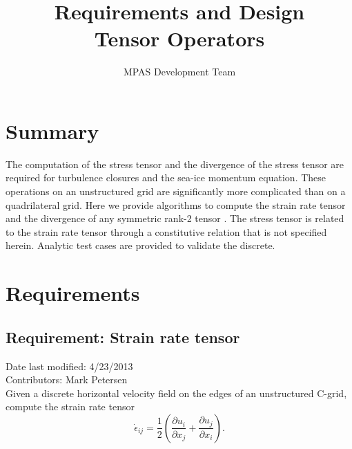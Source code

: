 \documentclass[11pt]{report}
\begin{document}
\title{
Requirements and Design\\
Tensor Operators}
\author{MPAS Development Team}

\maketitle
\tableofcontents


\chapter{Summary}

The computation of the stress tensor and the divergence of the stress tensor are required for turbulence closures and the sea-ice momentum equation.  These operations on an unstructured grid are significantly more complicated than on a quadrilateral grid.  Here we provide algorithms to compute the strain rate tensor and the divergence of any symmetric rank-2 tensor . The stress tensor is related to the strain rate tensor through a constitutive relation that is not specified herein.  Analytic test cases are provided to validate the discrete.




\chapter{Requirements}

\section{Requirement: Strain rate tensor}
Date last modified: 4/23/2013 \\
Contributors: Mark Petersen \\

 Given a discrete horizontal velocity field on the edges of an unstructured C-grid, compute the strain rate tensor 
\begin{equation}
\dot{\epsilon}_{ij} = \frac{1}{2}\left(\frac{\partial u_i}{\partial x_j} 
                                     + \frac{\partial u_j}{\partial x_i}\right).
\end{equation}
\end{document}
